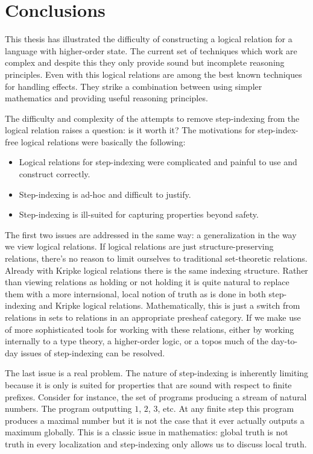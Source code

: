 \section{Conclusions}

This thesis has illustrated the difficulty of constructing a logical
relation for a language with higher-order state. The current set of
techniques which work are complex and despite this they only provide
sound but incomplete reasoning principles. Even with this logical
relations are among the best known techniques for handling
effects. They strike a combination between using simpler mathematics
and providing useful reasoning principles.

The difficulty and complexity of the attempts to remove step-indexing
from the logical relation raises a question: is it worth it? The
motivations for step-index-free logical relations were basically the
following:
\begin{itemize}
\item Logical relations for step-indexing were complicated and
  painful to use and construct correctly.
\item Step-indexing is ad-hoc and difficult to justify.
\item Step-indexing is ill-suited for capturing properties beyond
  safety.
\end{itemize}
The first two issues are addressed in the same way: a generalization
in the way we view logical relations. If logical relations are just
structure-preserving relations, there's no reason to limit ourselves
to traditional set-theoretic relations. Already with Kripke logical
relations there is the same indexing structure. Rather than viewing
relations as holding or not holding it is quite natural to replace
them with a more internsional, local notion of truth as is done in
both step-indexing and Kripke logical relations. Mathematically, this
is just a switch from relations in sets to relations in an appropriate
presheaf category. If we make use of more sophisticated tools for
working with these relations, either by working internally to a type
theory, a higher-order logic, or a topos much of the day-to-day issues
of step-indexing can be resolved.

The last issue is a real problem. The nature of step-indexing is
inherently limiting because it is only is suited for properties that
are sound with respect to finite prefixes. Consider for instance, the
set of programs producing a stream of natural numbers. The program
outputting $1$, $2$, $3$, etc. At any finite step this program
produces a maximal number but it is not the case that it ever actually
outputs a maximum globally. This is a classic issue in mathematics:
global truth is not truth in every localization and step-indexing only
allows us to discuss local truth.

